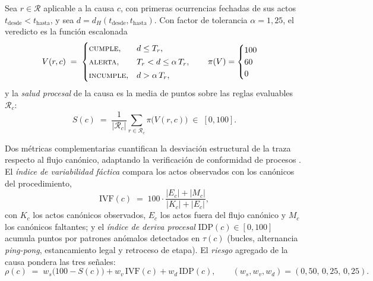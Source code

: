 \documentclass[computers,article,submit,pdftex,moreauthors]{Definitions/mdpi}
\begin{document}
\begin{Definition}
Sea $r \in \mathcal{R}$ aplicable a la causa $c$, con primeras ocurrencias fechadas de sus actos $t_{\mathrm{desde}} < t_{\mathrm{hasta}}$, y sea $d = d_H(t_{\mathrm{desde}}, t_{\mathrm{hasta}})$. Con factor de tolerancia $\alpha = 1{,}25$, el veredicto es la función escalonada
\begin{equation}
V(r, c) \;=\;
\begin{cases}
\textsc{cumple}, & d \le T_r,\\[2pt]
\textsc{alerta}, & T_r < d \le \alpha\, T_r,\\[2pt]
\textsc{incumple}, & d > \alpha\, T_r,
\end{cases}
\qquad
\pi(V) = \begin{cases} 100\\ 60\\ 0 \end{cases}
\label{eq:verdict}
\end{equation}
y la \emph{salud procesal} de la causa es la media de puntos sobre las reglas evaluables $\mathcal{R}_c$:
\begin{equation}
S(c) \;=\; \frac{1}{|\mathcal{R}_c|} \sum_{r \in \mathcal{R}_c} \pi\bigl(V(r,c)\bigr) \;\in\; [0, 100].
\label{eq:salud}
\end{equation}
\end{Definition}

Dos métricas complementarias cuantifican la desviación estructural de la traza respecto al flujo canónico, adaptando la verificación de conformidad de procesos \cite{Rozinat2008}. El \emph{índice de variabilidad fáctica} compara los actos observados con los canónicos del procedimiento,
\begin{equation}
\mathrm{IVF}(c) \;=\; 100 \cdot \frac{|E_c| + |M_c|}{|K_c| + |E_c|},
\label{eq:ivf}
\end{equation}
con $K_c$ los actos canónicos observados, $E_c$ los actos fuera del flujo canónico y $M_c$ los canónicos faltantes; y el \emph{índice de deriva procesal} $\mathrm{IDP}(c) \in [0,100]$ acumula puntos por patrones anómalos detectados en $\tau(c)$ (bucles, alternancia \emph{ping-pong}, estancamiento legal y retroceso de etapa). El \emph{riesgo} agregado de la causa pondera las tres señales:
\begin{equation}
\rho(c) \;=\; w_s \bigl(100 - S(c)\bigr) + w_v\, \mathrm{IVF}(c) + w_d\, \mathrm{IDP}(c),
\qquad (w_s, w_v, w_d) = (0{,}50,\, 0{,}25,\, 0{,}25).
\label{eq:riesgo}
\end{equation}
\end{document}
